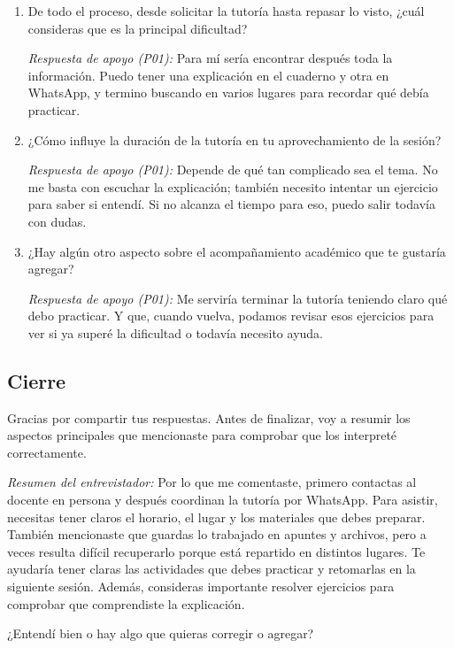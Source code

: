 \documentclass[11pt,a4paper]{article}
\begin{document}
\begin{enumerate}[resume,label=\textbf{\arabic*.}]
    \item De todo el proceso, desde solicitar la tutoría
    hasta repasar lo visto, ¿cuál consideras que es la
    principal dificultad?

    \textit{Respuesta de apoyo (P01):} Para mí sería encontrar después toda la información. Puedo tener una explicación en el cuaderno y otra en WhatsApp, y termino buscando en varios lugares para recordar qué debía practicar.

    \item ¿Cómo influye la duración de la tutoría en tu
    aprovechamiento de la sesión?

    \textit{Respuesta de apoyo (P01):} Depende de qué tan complicado sea el tema. No me basta con escuchar la explicación; también necesito intentar un ejercicio para saber si entendí. Si no alcanza el tiempo para eso, puedo salir todavía con dudas.

    \item ¿Hay algún otro aspecto sobre el acompañamiento
    académico que te gustaría agregar?

    \textit{Respuesta de apoyo (P01):} Me serviría terminar la tutoría teniendo claro qué debo practicar. Y que, cuando vuelva, podamos revisar esos ejercicios para ver si ya superé la dificultad o todavía necesito ayuda.
\end{enumerate}

\subsection{Cierre}

Gracias por compartir tus respuestas. Antes de finalizar,
voy a resumir los aspectos principales que mencionaste
para comprobar que los interpreté correctamente.

\textit{Resumen del entrevistador:} Por lo que me comentaste, primero contactas al docente en persona y después coordinan la tutoría por WhatsApp. Para asistir, necesitas tener claros el horario, el lugar y los materiales que debes preparar. También mencionaste que guardas lo trabajado en apuntes y archivos, pero a veces resulta difícil recuperarlo porque está repartido en distintos lugares. Te ayudaría tener claras las actividades que debes practicar y retomarlas en la siguiente sesión. Además, consideras importante resolver ejercicios para comprobar que comprendiste la explicación.

¿Entendí bien o hay algo que quieras corregir o agregar?
\end{document}
